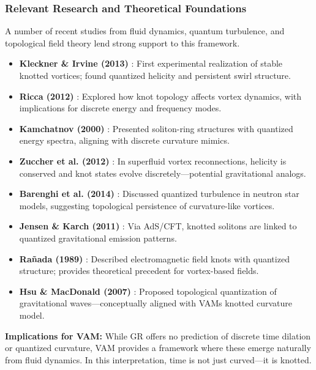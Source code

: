 \subsubsection{Relevant Research and Theoretical Foundations}

A number of recent studies from fluid dynamics, quantum turbulence, and topological field theory lend strong support to this framework.

\begin{itemize}
    \item \textbf{Kleckner \& Irvine (2013)} \cite{kleckner2013}: First experimental realization of stable knotted vortices; found quantized helicity and persistent swirl structure.

    \item \textbf{Ricca (2012)} \cite{ricca2012}: Explored how knot topology affects vortex dynamics, with implications for discrete energy and frequency modes.

    \item \textbf{Kamchatnov (2000)} \cite{kamchatnov2000}: Presented soliton-ring structures with quantized energy spectra, aligning with discrete curvature mimics.

    \item \textbf{Zuccher et al. (2012)} \cite{zuccher2012}: In superfluid vortex reconnections, helicity is conserved and knot states evolve discretely—potential gravitational analogs.

    \item \textbf{Barenghi et al. (2014)} \cite{barenghi2014}: Discussed quantized turbulence in neutron star models, suggesting topological persistence of curvature-like vortices.

    \item \textbf{Jensen \& Karch (2011)} \cite{jensen2011}: Via AdS/CFT, knotted solitons are linked to quantized gravitational emission patterns.

    \item \textbf{Rañada (1989)} \cite{ranada1989}: Described electromagnetic field knots with quantized structure; provides theoretical precedent for vortex-based fields.

    \item \textbf{Hsu \& MacDonald (2007)} \cite{hsu2007}: Proposed topological quantization of gravitational waves—conceptually aligned with VAM\rqs s knotted curvature model.
\end{itemize}

\textbf{Implications for VAM:} While GR offers no prediction of discrete time dilation or quantized curvature, VAM provides a framework where these emerge naturally from fluid dynamics. In this interpretation, time is not just curved—it is knotted.


